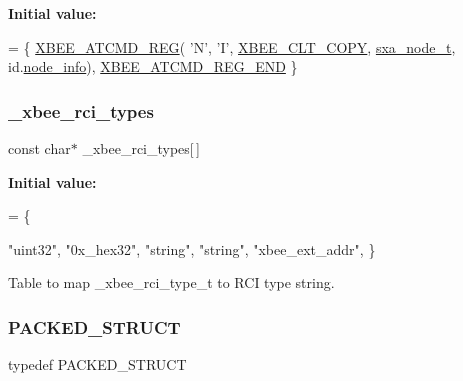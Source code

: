 {\bfseries Initial value\+:}
\begin{DoxyCode}
= \{
   \hyperlink{group__xbee__atcmd_gaafe33c3d8ea48b42b25d1183eaf93071}{XBEE\_ATCMD\_REG}( \textcolor{charliteral}{'N'}, \textcolor{charliteral}{'I'}, \hyperlink{group__xbee__atcmd_gga1bd8ecd38c107579d20ded3c79a7d70baef8d715c8725d801676943b868508633}{XBEE\_CLT\_COPY}, 
      \hyperlink{structsxa__node__t}{sxa\_node\_t}, \textcolor{keywordtype}{id}.\hyperlink{group__xbee__discovery_gaa667bab3abb953bc14d9f5bcc36644b8}{node\_info}),
   \hyperlink{group__xbee__atcmd_ga22fe547f7ae9fd0b090c5e45f03c162d}{XBEE\_ATCMD\_REG\_END}
\}
\end{DoxyCode}
\mbox{\label{group___s_x_a_ga62238d483c628f8c996664ff0f47ccef}} 
\subsubsection{\texorpdfstring{\+\_\+xbee\+\_\+rci\+\_\+types}{\_xbee\_rci\_types}}
{\footnotesize\ttfamily const char$\ast$ \+\_\+xbee\+\_\+rci\+\_\+types\mbox{[}$\,$\mbox{]}}

{\bfseries Initial value\+:}
\begin{DoxyCode}
=
\{
   
   \textcolor{stringliteral}{"uint32"},
   \textcolor{stringliteral}{"0x\_hex32"},
   \textcolor{stringliteral}{"string"},
   \textcolor{stringliteral}{"string"},
   \textcolor{stringliteral}{"xbee\_ext\_addr"},
\}
\end{DoxyCode}


Table to map \+\_\+xbee\+\_\+rci\+\_\+type\+\_\+t to R\+CI type string. 

\mbox{\label{group___s_x_a_ga4233297bd31be5c273d4fb0758cc54d7}} 
\subsubsection{\texorpdfstring{P\+A\+C\+K\+E\+D\+\_\+\+S\+T\+R\+U\+CT}{PACKED\_STRUCT}}
{\footnotesize\ttfamily typedef P\+A\+C\+K\+E\+D\+\_\+\+S\+T\+R\+U\+CT}

